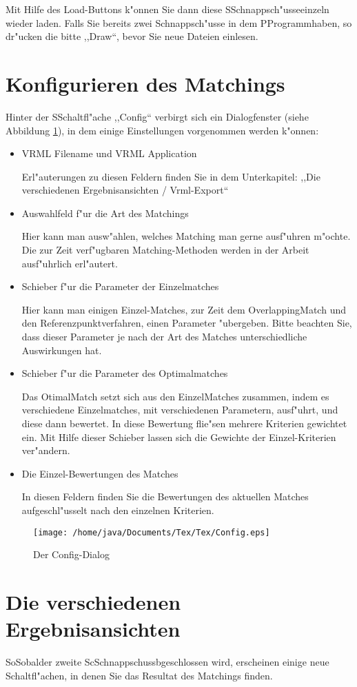 Mit Hilfe des Load-Buttons k"onnen Sie dann diese SSchnappsch"usseeinzeln wieder laden. Falls Sie bereits zwei Schnappsch"usse in dem PProgrammhaben, so dr"ucken die bitte ,,Draw``, bevor Sie neue Dateien einlesen.
\section{Konfigurieren des Matchings}
Hinter der SSchaltfl"ache ,,Config`` verbirgt sich ein Dialogfenster (siehe Abbildung \ref{fig:Config}), in dem einige Einstellungen vorgenommen werden k"onnen:
\begin{itemize}
\item VRML Filename und VRML Application

Erl"auterungen zu diesen Feldern finden Sie in dem Unterkapitel: ,,Die verschiedenen Ergebnisansichten / Vrml-Export``
\item Auswahlfeld f"ur die Art des Matchings

Hier kann man ausw"ahlen, welches Matching man gerne ausf"uhren m"ochte. Die zur Zeit verf"ugbaren Matching-Methoden werden in der Arbeit ausf"uhrlich erl"autert.
\item Schieber f"ur die Parameter der Einzelmatches

Hier kann man einigen Einzel-Matches, zur Zeit dem OverlappingMatch und den Referenzpunktverfahren, einen Parameter "ubergeben. Bitte beachten Sie, dass dieser Parameter je nach der Art des Matches unterschiedliche Auswirkungen hat.
\item Schieber f"ur die Parameter des Optimalmatches

Das OtimalMatch setzt sich aus den EinzelMatches zusammen, indem es verschiedene Einzelmatches, mit verschiedenen Parametern, ausf"uhrt, und diese dann bewertet. In diese Bewertung flie"sen mehrere Kriterien gewichtet ein. Mit Hilfe dieser Schieber lassen sich die Gewichte der Einzel-Kriterien ver"andern.
\item Die Einzel-Bewertungen des Matches

In diesen Feldern finden Sie die Bewertungen des aktuellen Matches aufgeschl"usselt nach den einzelnen Kriterien.
\end{itemize} 
\begin{figure}
   \centering
   \texttt{[image: /home/java/Documents/Tex/Tex/Config.eps]}
   \caption{Der Config-Dialog}
   \label{fig:Config}
\end{figure}
\section{Die verschiedenen Ergebnisansichten}
SoSobalder zweite ScSchnappschussbgeschlossen wird, erscheinen einige neue Schaltfl"achen, in denen Sie das Resultat des Matchings finden.


